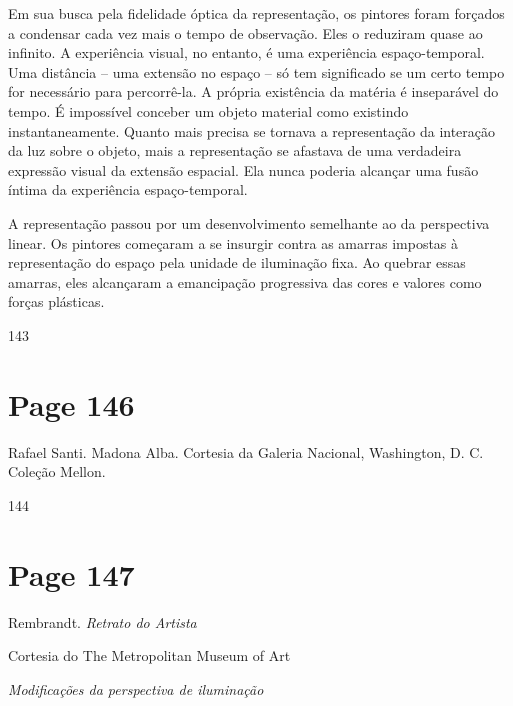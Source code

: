 \documentclass[a4paper]{article}
\begin{document}
Em sua busca pela fidelidade óptica da representação, os pintores foram forçados a condensar cada vez mais o tempo de observação. Eles o reduziram quase ao infinito. A experiência visual, no entanto, é uma experiência espaço-temporal. Uma distância -- uma extensão no espaço -- só tem significado se um certo tempo for necessário para percorrê-la. A própria existência da matéria é inseparável do tempo. É impossível conceber um objeto material como existindo instantaneamente. Quanto mais precisa se tornava a representação da interação da luz sobre o objeto, mais a representação se afastava de uma verdadeira expressão visual da extensão espacial. Ela nunca poderia alcançar uma fusão íntima da experiência espaço-temporal.

A representação passou por um desenvolvimento semelhante ao da perspectiva linear. Os pintores começaram a se insurgir contra as amarras impostas à representação do espaço pela unidade de iluminação fixa. Ao quebrar essas amarras, eles alcançaram a emancipação progressiva das cores e valores como forças plásticas.

\vspace{\fill}
\hfill 143

\newpage
\section*{Page 146}

\raggedright
Rafael Santi. Madona Alba. Cortesia da Galeria Nacional, Washington, D. C. Coleção Mellon.

144

\newpage
\section*{Page 147}

Rembrandt. \textit{Retrato do Artista}\par
Cortesia do The Metropolitan Museum of Art\par
\vspace{1.5em}

\noindent\textit{Modificações da perspectiva de iluminação}\par
\vspace{1em}
\end{document}
